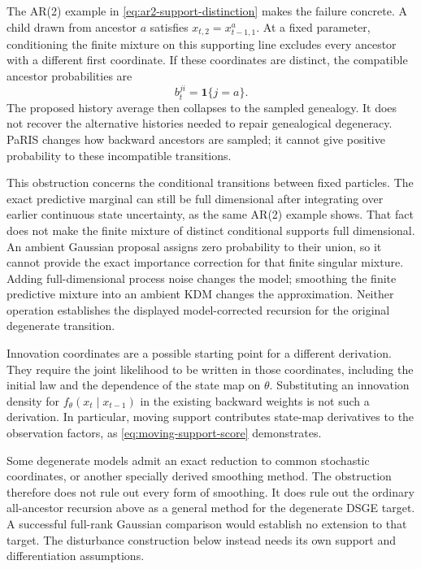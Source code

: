 \documentclass[11pt]{article}
\begin{document}
The AR(2) example in \eqref{eq:ar2-support-distinction} makes the failure
concrete. A child drawn from ancestor $a$ satisfies
$x_{t,2}=x_{t-1,1}^a$. At a fixed parameter, conditioning the finite mixture
on this supporting line excludes every ancestor with a different first
coordinate. If these coordinates are distinct, the compatible ancestor
probabilities are
\begin{equation}
 b_t^{ji}=\mathbf 1\{j=a\}.
 \label{eq:degenerate-ancestor-collapse}
\end{equation}
The proposed history average then collapses to the sampled genealogy. It
does not recover the alternative histories needed to repair genealogical
degeneracy. PaRIS changes how backward ancestors are sampled; it cannot
give positive probability to these incompatible transitions.

This obstruction concerns the conditional transitions between fixed
particles. The exact predictive marginal can still be full dimensional
after integrating over earlier continuous state uncertainty, as the same
AR(2) example shows. That fact does not make the finite mixture of distinct
conditional supports full dimensional. An ambient Gaussian proposal assigns
zero probability to their union, so it cannot provide the exact importance
correction for that finite singular mixture. Adding full-dimensional process
noise changes the model; smoothing the finite predictive mixture into an
ambient KDM changes the approximation. Neither operation establishes the
displayed model-corrected recursion for the original degenerate transition.

Innovation coordinates are a possible starting point for a different
derivation. They require the joint likelihood to be written in those
coordinates, including the initial law and the dependence of the state map
on $\theta$. Substituting an innovation density for
$f_\theta(x_t\mid x_{t-1})$ in the existing backward weights is not such a
derivation. In particular, moving support contributes state-map derivatives
to the observation factors, as \eqref{eq:moving-support-score} demonstrates.

Some degenerate models admit an exact reduction to common stochastic
coordinates, or another specially derived smoothing method. The obstruction
therefore does not rule out every form of smoothing. It does rule out the
ordinary all-ancestor recursion above as a general method for the degenerate
DSGE target. A successful full-rank Gaussian comparison would establish no
extension to that target. The disturbance construction below instead needs
its own support and differentiation assumptions.
\end{document}
